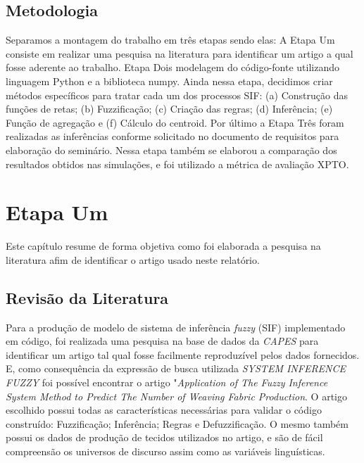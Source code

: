 \documentclass[courier]{uninove-ppgi}
\begin{document}
        
  
    
    \section{Metodologia}
    
		Separamos a montagem do trabalho em três etapas sendo elas: A Etapa Um consiste em realizar uma pesquisa na literatura para identificar um artigo a qual fosse aderente ao trabalho.
		Etapa Dois modelagem do código-fonte utilizando linguagem Python e a biblioteca numpy. Ainda nessa etapa, decidimos criar métodos específicos para tratar cada um dos processos SIF:
		(a) Construção das funções de retas; (b) Fuzzificação; (c) Criação das regras; (d) Inferência; (e) Função de agregação e (f) Cálculo do centroid.
		Por último a Etapa Três foram realizadas as inferências conforme solicitado no documento de requisitos para elaboração do seminário. Nessa etapa também se elaborou a comparação dos resultados obtidos nas simulações, 
		e foi utilizado a métrica de avaliação XPTO.
    
     \chapter{Etapa Um}
    
        \begin{resumocapitulo}
            Este capítulo resume de forma objetiva como foi elaborada a pesquisa na literatura afim de identificar o artigo usado neste relatório. 
        \end{resumocapitulo}
		
		\section{Revisão da Literatura}
		
		Para a produção de modelo de sistema de inferência \textit{fuzzy} (SIF) implementado em código, foi realizada uma pesquisa na base de dados da \textit{CAPES} 
		para identificar um artigo tal qual fosse facilmente reproduzível pelos dados fornecidos. E, como consequência da expressão de busca utilizada \textit{SYSTEM INFERENCE FUZZY} 
		foi possível encontrar o artigo "\textit{Application of The Fuzzy Inference System Method to Predict The Number of Weaving Fabric Production}.
		O artigo escolhido possui todas as características necessárias para validar o código construído: Fuzzificação; Inferência; Regras e Defuzzificação.
		O mesmo também possui os dados de produção de tecidos utilizados no artigo, e são de fácil compreensão os universos de discurso assim como as variáveis linguísticas.
    
\end{document}
